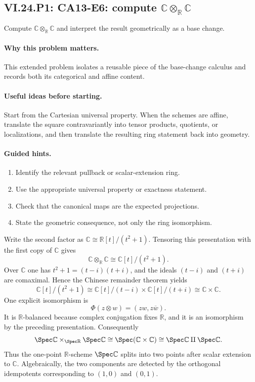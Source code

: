 \subsection*{VI.24.P1: CA13-E6: compute $\mathbb C\otimes_{\mathbb R}\mathbb C$}
\begin{problem}\label{prob:vi24-p01}
Compute $\mathbb C\otimes_{\mathbb R}\mathbb C$ and interpret the result geometrically as a base change.
\end{problem}

\ifdefined\FullProblemDossiers
\paragraph{Why this problem matters.}
This extended problem isolates a reusable piece of the base-change calculus and records both its categorical and affine content.

\paragraph{Useful ideas before starting.}
Start from the Cartesian universal property.  When the schemes are affine, translate the square contravariantly into tensor products, quotients, or localizations, and then translate the resulting ring statement back into geometry.

\paragraph{Guided hints.}
\begin{enumerate}
\item Identify the relevant pullback or scalar-extension ring.
\item Use the appropriate universal property or exactness statement.
\item Check that the canonical maps are the expected projections.
\item State the geometric consequence, not only the ring isomorphism.
\end{enumerate}

\begin{solution}
Write the second factor as $\mathbb C\cong\mathbb R[t]/(t^2+1)$.  Tensoring this presentation with the first copy of $\mathbb C$ gives
\[
\mathbb C\otimes_{\mathbb R}\mathbb C
\cong \mathbb C[t]/(t^2+1).
\]
Over $\mathbb C$ one has $t^2+1=(t-i)(t+i)$, and the ideals $(t-i)$ and $(t+i)$ are comaximal.  Hence the Chinese remainder theorem yields
\[
\mathbb C[t]/(t^2+1)\cong\mathbb C[t]/(t-i)\times\mathbb C[t]/(t+i)\cong\mathbb C\times\mathbb C.
\]
One explicit isomorphism is
\[
\Phi(z\otimes w)=(zw,z\overline w).
\]
It is $\mathbb R$-balanced because complex conjugation fixes $\mathbb R$, and it is an isomorphism by the preceding presentation.  Consequently
\[
\Spec\mathbb C\times_{\Spec\mathbb R}\Spec\mathbb C
\cong \Spec(\mathbb C\times\mathbb C)
\cong \Spec\mathbb C\amalg\Spec\mathbb C.
\]
Thus the one-point $\mathbb R$-scheme $\Spec\mathbb C$ splits into two points after scalar extension to $\mathbb C$.  Algebraically, the two components are detected by the orthogonal idempotents corresponding to $(1,0)$ and $(0,1)$.
\end{solution}

